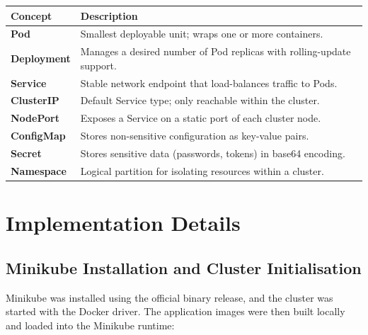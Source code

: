 \documentclass[12pt,a4paper]{article}
\begin{document}
\begin{center}
\begin{tabular}{>{\bfseries}p{3cm} p{10cm}}
\toprule
Concept & Description \\
\midrule
Pod        & Smallest deployable unit; wraps one or more containers. \\
 Deployment & Manages a desired number of Pod replicas with rolling-update support. \\
Service    & Stable network endpoint that load-balances traffic to Pods. \\
ClusterIP  & Default Service type; only reachable within the cluster. \\
NodePort   & Exposes a Service on a static port of each cluster node. \\
ConfigMap  & Stores non-sensitive configuration as key-value pairs. \\
 Secret     & Stores sensitive data (passwords, tokens) in base64 encoding. \\
Namespace  & Logical partition for isolating resources within a cluster. \\
\bottomrule
\end{tabular}
\end{center}

\section{Implementation Details}

\subsection{Minikube Installation and Cluster Initialisation}

Minikube was installed using the official binary release, and the cluster was
started with the Docker driver. The application images were then built locally
and loaded into the Minikube runtime:
\end{document}
